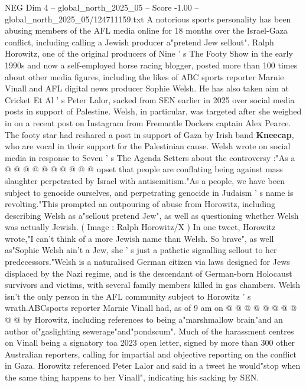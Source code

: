 \begin{textsample}{NEG Dim 4 – global\_north\_2025\_05 – Score -1.00 – global\_north\_2025\_05/124711159.txt}  \label{ex:f4_neg_261}
A notorious sports personality has been abusing members of the AFL media online for 18 months over the Israel-Gaza conflict, including calling a Jewish producer a"pretend Jew sellout".
Ralph Horowitz, one of the original producers of Nine ' s The Footy Show in the early 1990s and now a self-employed horse racing blogger, posted more than 100 times about other media figures, including the likes of ABC sports reporter Marnie Vinall and AFL digital news producer Sophie Welsh.
He has also taken aim at Cricket Et Al ' s Peter Lalor, sacked from SEN earlier in 2025 over social media posts in support of Palestine.
Welsh, in particular, was targeted after she weighed in on a recent post on Instagram from Fremantle Dockers captain Alex Pearce.
The footy star had reshared a post in support of Gaza by Irish band \textbf{Kneecap}, who are vocal in their support for the Palestinian cause.
Welsh wrote on social media in response to Seven ' s The Agenda Setters about the controversy :"As a @ @ @ @ @ @ @ @ @ @ upset that people are conflating being against mass slaughter perpetrated by Israel with antisemitism."As a people, we have been subject to genocide ourselves, and perpetrating genocide in Judaism ' s name is revolting."This prompted an outpouring of abuse from Horowitz, including describing Welsh as a"sellout pretend Jew", as well as questioning whether Welsh was actually Jewish. ( Image : Ralph Horowitz/X ) In one tweet, Horowitz wrote,"I can't think of a more Jewish name than Welsh.
So brave", as well as"Sophie Welsh ain't a Jew, she ' s just a pathetic signalling sellout to her predecessors."Welsh is a naturalised German citizen via laws designed for Jews displaced by the Nazi regime, and is the descendant of German-born Holocaust survivors and victims, with several family members killed in gas chambers.
Welsh isn't the only person in the AFL community subject to Horowitz ' s wrath.ABCsports reporter Marnie Vinall had, as of 9 am on @ @ @ @ @ @ @ @ @ @ by Horowitz, including references to being a"marshmallow brain"and an author of"gaslighting sewerage"and"pondscum".
Much of the harassment centres on Vinall being a signatory toa 2023 open letter, signed by more than 300 other Australian reporters, calling for impartial and objective reporting on the conflict in Gaza.
Horowitz referenced Peter Lalor and said in a tweet he would"stop when the same thing happens to her Vinall", indicating his sacking by SEN.

\end{textsample}
